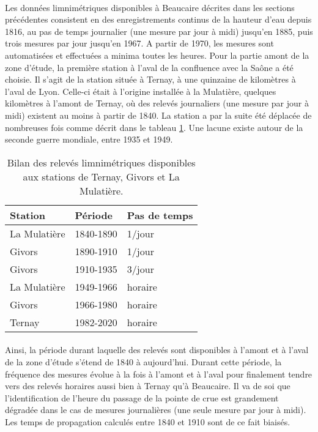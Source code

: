 \documentclass[11pt]{article}
\begin{document}
	\paragraph{} Les données limnimétriques disponibles à Beaucaire décrites dans les sections précédentes consistent en des enregistrements continus de la hauteur d'eau depuis 1816, au pas de temps journalier (une mesure par jour à midi) jusqu'en 1885, puis trois mesures par jour jusqu'en 1967. A partir de 1970, les mesures sont automatisées et effectuées a minima toutes les heures. Pour la partie amont de la zone d'étude, la première station à l'aval de la confluence avec la Saône a été choisie. Il s'agit de la station située à Ternay, à une quinzaine de kilomètres à l'aval de Lyon. Celle-ci était à l'origine installée à la Mulatière, quelques kilomètres à l'amont de Ternay, où des relevés journaliers (une mesure par jour à midi) existent au moins à partir de 1840. La station a par la suite été déplacée de nombreuses fois comme décrit dans le tableau \ref{tab:Hternay}. Une lacune existe autour de la seconde guerre mondiale, entre 1935 et 1949. 
	
	\begin{table}[h]
	\centering
	\caption{Bilan des relevés limnimétriques disponibles aux stations de Ternay, Givors et La Mulatière.}
	\label{tab:Hternay}
		\begin{tabular}{|l|l|l|}
			\hline
			Station      & Période   & Pas de temps \\ \hline
			La Mulatière & 1840-1890 & 1/jour       \\ \hline
			Givors       & 1890-1910 & 1/jour       \\ \hline
			Givors       & 1910-1935 & 3/jour       \\ \hline
			La Mulatière & 1949-1966 & horaire      \\ \hline
			Givors       & 1966-1980 & horaire      \\ \hline
			Ternay       & 1982-2020 & horaire      \\ \hline
		\end{tabular}
	\end{table}

	
	\paragraph{} Ainsi, la période durant laquelle des relevés sont disponibles à l'amont et à l'aval de la zone d'étude s'étend de 1840 à aujourd'hui. Durant cette période, la fréquence des mesures évolue à la fois à l'amont et à l'aval pour finalement tendre vers des relevés horaires aussi bien à Ternay qu'à Beaucaire. Il va de soi que l'identification de l'heure du passage de la pointe de crue est grandement dégradée dans le cas de mesures journalières (une seule mesure par jour à midi). Les temps de propagation calculés entre 1840 et 1910 sont de ce fait biaisés.
	
\end{document}
